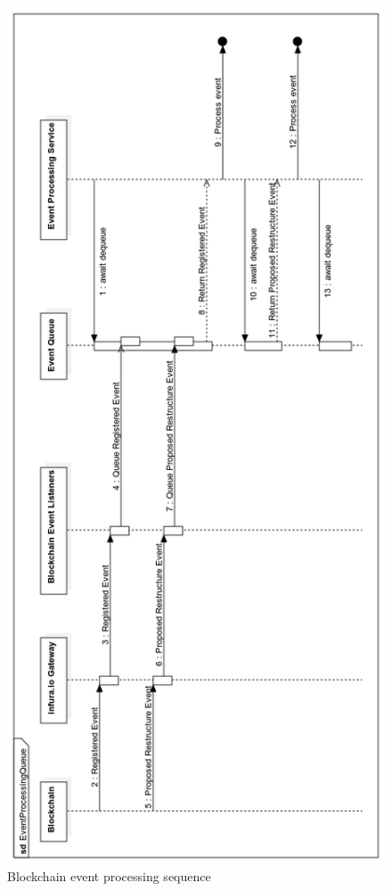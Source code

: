 \begin{figure}[H]
\caption{Blockchain event processing sequence}
\centering
\includegraphics[width=\textwidth,height=\textheight,keepaspectratio]{images/operational/EventProcessingQueue}
\end{figure}

